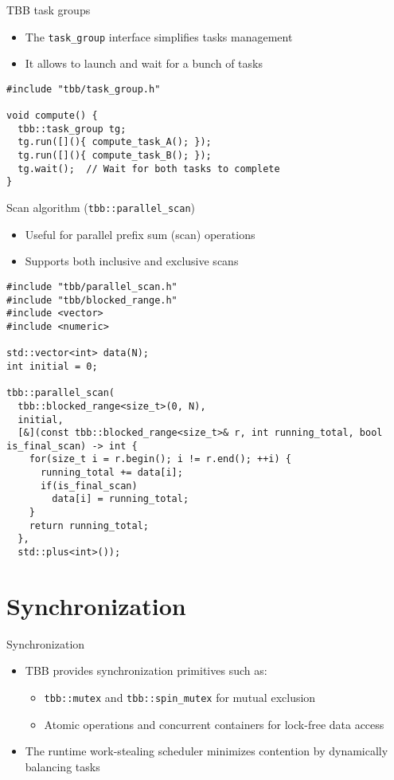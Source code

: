 \documentclass{beamer}
\begin{document}
\begin{frame}[fragile]{TBB task groups}
  \begin{itemize}
    \item The \texttt{task\_group} interface simplifies tasks management
    \item It allows to launch and wait for a bunch of tasks
  \end{itemize}
  \vspace{0.5em}
  \lstset{style=CStyle}
  \begin{lstlisting}
#include "tbb/task_group.h"

void compute() {
  tbb::task_group tg;
  tg.run([](){ compute_task_A(); });
  tg.run([](){ compute_task_B(); });
  tg.wait();  // Wait for both tasks to complete
}
  \end{lstlisting}
\end{frame}

\begin{frame}[fragile]{Scan algorithm (\texttt{tbb::parallel\_scan})}
  \begin{itemize}
    \item Useful for parallel prefix sum (scan) operations
    \item Supports both inclusive and exclusive scans
  \end{itemize}
  \vspace{0.5em}
  \lstset{style=CStyle}
  \begin{lstlisting}
#include "tbb/parallel_scan.h"
#include "tbb/blocked_range.h"
#include <vector>
#include <numeric>

std::vector<int> data(N);
int initial = 0;

tbb::parallel_scan(
  tbb::blocked_range<size_t>(0, N),
  initial,
  [&](const tbb::blocked_range<size_t>& r, int running_total, bool is_final_scan) -> int {
    for(size_t i = r.begin(); i != r.end(); ++i) {
      running_total += data[i];
      if(is_final_scan)
        data[i] = running_total;
    }
    return running_total;
  },
  std::plus<int>());
  \end{lstlisting}
\end{frame}

\section{Synchronization}

\begin{frame}{Synchronization}
  \begin{itemize}
    \item TBB provides synchronization primitives such as:
      \begin{itemize}
        \item \texttt{tbb::mutex} and \texttt{tbb::spin\_mutex} for mutual exclusion
        \item Atomic operations and concurrent containers for lock-free data access
      \end{itemize}
    \item The runtime work-stealing scheduler minimizes contention by dynamically balancing tasks
  \end{itemize}
\end{frame}
\end{document}
